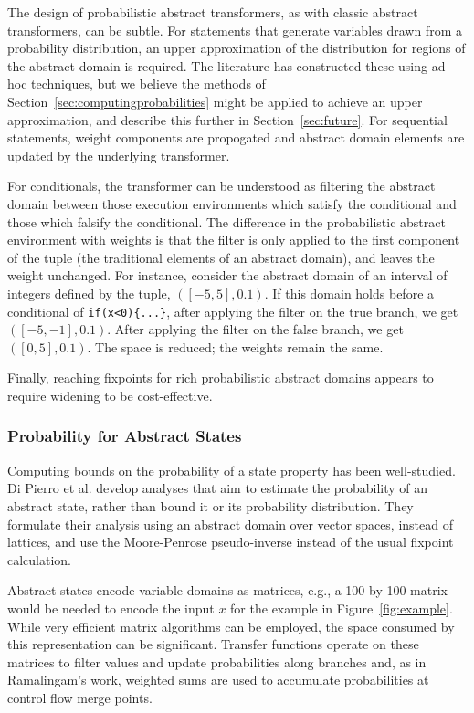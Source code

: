 The design of probabilistic abstract transformers, as with 
classic abstract transformers, can be subtle.
For statements that generate variables drawn from a probability
distribution, an upper approximation of the distribution for
regions of the abstract domain is required.  The literature
has constructed these using ad-hoc techniques, but we believe
the methods of Section~\ref{sec:computingprobabilities} might be applied to 
achieve an upper approximation, and describe this further in Section~\ref{sec:future}.
For sequential statements, weight components are propogated
and abstract domain elements are updated by the underlying transformer.

For conditionals, the transformer can be understood
as filtering the abstract domain between those execution environments which
satisfy the conditional and those which falsify the conditional. 
The difference in the probabilistic abstract environment with weights 
is that the filter is only applied to the first component of
the tuple (the traditional elements of an abstract domain), 
and leaves the weight unchanged.
For instance, consider the abstract domain of an interval of 
integers defined by the tuple, $([-5,5],0.1)$. 
If this domain holds before a conditional of 
{\tt if(x<0)\{...\}}, after applying the filter on the true branch, 
we get $([-5,-1],0.1)$. 
After applying the filter on the false branch, we get $([0,5],0.1)$.
The space is reduced; the weights remain the same.

Finally, reaching fixpoints for rich probabilistic abstract domains
appears to require widening \cite{monniaux2000abstract,esparza2011probabilistic} to be cost-effective.

\subsubsection{Probability for Abstract States}

Computing bounds on the probability of a state property has been well-studied.
Di Pierro et al. \cite{di2013probabilistic} develop analyses
that aim to estimate the probability of an abstract state, 
rather than bound it or its probability distribution.  
They formulate their analysis using an abstract 
domain over vector spaces, instead of lattices, and use
the Moore-Penrose pseudo-inverse instead of the usual fixpoint calculation.

Abstract states encode variable domains as matrices, e.g., a 100 by 100 matrix
would be needed to encode the input $x$ for the example in 
Figure~\ref{fig:example}.  While very efficient matrix algorithms
can be employed, the space consumed by this representation can
be significant.  
Transfer functions operate on these matrices to filter values and
update probabilities along branches and, 
as in Ramalingam's work, weighted sums are used to accumulate probabilities
at control flow merge points.

